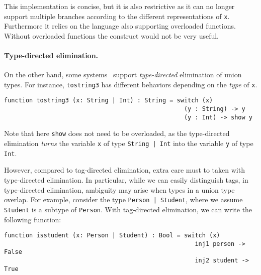 \noindent This implementation is concise, but it is also restrictive as it can no longer
support multiple branches according to the different representations of
\lstinline{x}. Furthermore it relies on the language also supporting overloaded
functions. Without overloaded functions the construct would not be very useful.

\paragraph{Type-directed elimination.}

On the other hand, some
systems~\cite{castagna:settheoretic} support
\textit{type-directed} elimination of union types. For instance,
\lstinline{tostring3} has different behaviors depending on the \textit{type} of
\lstinline{x}.

\begin{lstlisting}
function tostring3 (x: String | Int) : String = switch (x)
                                                  (y : String) -> y
                                                  (y : Int) -> show y
\end{lstlisting}

\noindent Note that here \lstinline{show} does not need to be overloaded,
as the type-directed elimination
\textit{turns} the variable \lstinline{x} of type \lstinline{String | Int} into
the variable \lstinline{y} of type \lstinline{Int}.

However, compared to tag-directed elimination, extra care must to taken with
type-directed elimination. In particular, while we can easily distinguish tags,
in type-directed elimination, ambiguity may arise when types in a union type
overlap. For example, consider the type \lstinline{Person | Student}, where we
assume \lstinline{Student} is a subtype of \lstinline{Person}. With tag-directed
elimination, we can write the following function:

\begin{lstlisting}
function isstudent (x: Person | Student) : Bool = switch (x)
                                                     inj1 person -> False
                                                     inj2 student -> True
\end{lstlisting}

